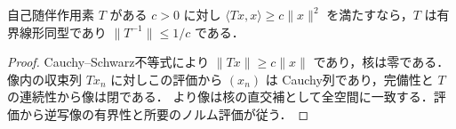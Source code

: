 \begin{prop}[強正値性と可逆性]
自己随伴作用素 $T$ がある $c>0$ に対し $\langle Tx,x\rangle\geq c\|x\|^2$ を満たすなら，$T$ は有界線形同型であり $\|T^{-1}\|\leq1/c$ である．
\end{prop}
\begin{proof}
Cauchy–Schwarz不等式により $\|Tx\|\geq c\|x\|$ であり，核は零である．像内の収束列 $Tx_n$ に対しこの評価から $(x_n)$ は Cauchy列であり，完備性と $T$ の連続性から像は閉である． より像は核の直交補として全空間に一致する．評価から逆写像の有界性と所要のノルム評価が従う．
\end{proof}
